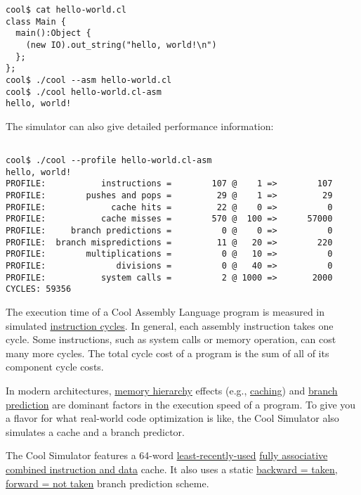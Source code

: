 \documentclass[]{article}
\begin{document}
\begin{verbatim}
cool$ cat hello-world.cl
class Main {
  main():Object {
    (new IO).out_string("hello, world!\n")
  };
};
cool$ ./cool --asm hello-world.cl
cool$ ./cool hello-world.cl-asm 
hello, world!
\end{verbatim}

The simulator can also give detailed performance information:

\begin{verbatim}
 
cool$ ./cool --profile hello-world.cl-asm 
hello, world!
PROFILE:           instructions =        107 @    1 =>        107
PROFILE:        pushes and pops =         29 @    1 =>         29
PROFILE:             cache hits =         22 @    0 =>          0
PROFILE:           cache misses =        570 @  100 =>      57000
PROFILE:     branch predictions =          0 @    0 =>          0
PROFILE:  branch mispredictions =         11 @   20 =>        220
PROFILE:        multiplications =          0 @   10 =>          0
PROFILE:              divisions =          0 @   40 =>          0
PROFILE:           system calls =          2 @ 1000 =>       2000
CYCLES: 59356
\end{verbatim}

The execution time of a Cool Assembly Language program is measured in
simulated \href{http://en.wikipedia.org/wiki/CPU_cycle}{instruction
cycles}. In general, each assembly instruction takes one cycle. Some
instructions, such as system calls or memory operation, can cost many
more cycles. The total cycle cost of a program is the sum of all of its
component cycle costs.

In modern architectures,
\href{http://en.wikipedia.org/wiki/Memory_hierarchy}{memory hierarchy}
effects (e.g., \href{http://en.wikipedia.org/wiki/Cache}{caching}) and
\href{http://en.wikipedia.org/wiki/Branch_prediction}{branch prediction}
are dominant factors in the execution speed of a program. To give you a
flavor for what real-world code optimization is like, the Cool Simulator
also simulates a cache and a branch predictor.

The Cool Simulator features a 64-word
\href{http://en.wikipedia.org/wiki/Cache_algorithms\#Least_Recently_Used}{least-recently-used}
\href{http://en.wikipedia.org/wiki/CPU_cache\#Associativity}{fully
associative}
\href{http://en.wikipedia.org/wiki/Von_Neumann_architecture}{combined
instruction and data} cache. It also uses a static
\href{http://en.wikipedia.org/wiki/Branch_predictor\#Static_prediction}{backward
= taken, forward = not taken} branch prediction scheme.
\end{document}
